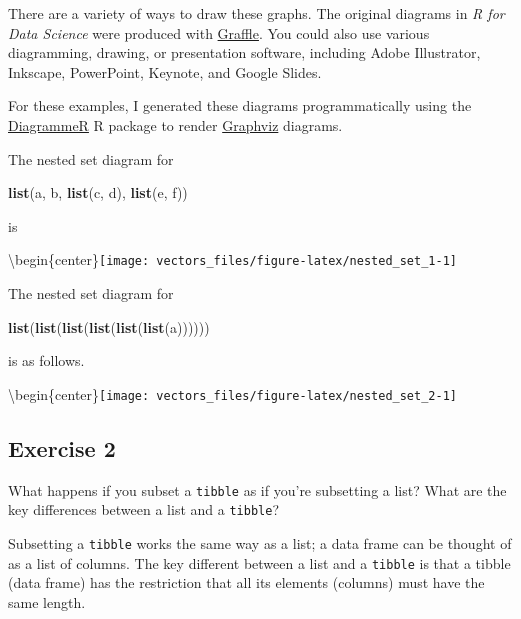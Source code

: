 \documentclass[]{book}
\newenvironment{Shaded}{\begin{snugshade}}{\end{snugshade}}
\newcommand{\KeywordTok}[1]{\textcolor[rgb]{0.13,0.29,0.53}{\textbf{#1}}}
\newcommand{\NormalTok}[1]{#1}
\theoremstyle{plain}
\theoremstyle{remark}
\theoremstyle{definition}
\theoremstyle{definition}
\theoremstyle{definition}
\theoremstyle{remark}
\begin{document}
There are a variety of ways to draw these graphs. The original diagrams
in \emph{R for Data Science} were produced with
\href{https://www.omnigroup.com/omnigraffle}{Graffle}. You could also
use various diagramming, drawing, or presentation software, including
Adobe Illustrator, Inkscape, PowerPoint, Keynote, and Google Slides.

For these examples, I generated these diagrams programmatically using
the
\href{http://rich-iannone.github.io/DiagrammeR/graphviz_and_mermaid.html}{DiagrammeR}
R package to render \href{https://www.graphviz.org/}{Graphviz} diagrams.

The nested set diagram for

\begin{Shaded}
\begin{Highlighting}[]
\KeywordTok{list}\NormalTok{(a, b, }\KeywordTok{list}\NormalTok{(c, d), }\KeywordTok{list}\NormalTok{(e, f))}
\end{Highlighting}
\end{Shaded}

is

\textbackslash{}begin\{center\}\texttt{[image: vectors\_files/figure-latex/nested\_set\_1-1]}

The nested set diagram for

\begin{Shaded}
\begin{Highlighting}[]
\KeywordTok{list}\NormalTok{(}\KeywordTok{list}\NormalTok{(}\KeywordTok{list}\NormalTok{(}\KeywordTok{list}\NormalTok{(}\KeywordTok{list}\NormalTok{(}\KeywordTok{list}\NormalTok{(a))))))}
\end{Highlighting}
\end{Shaded}

is as follows.

\textbackslash{}begin\{center\}\texttt{[image: vectors\_files/figure-latex/nested\_set\_2-1]}

\hypertarget{exercise-2-53}{%
\subsection{Exercise 2}\label{exercise-2-53}}

What happens if you subset a \texttt{tibble} as if you're subsetting a
list? What are the key differences between a list and a \texttt{tibble}?

Subsetting a \texttt{tibble} works the same way as a list; a data frame
can be thought of as a list of columns. The key different between a list
and a \texttt{tibble} is that a tibble (data frame) has the restriction
that all its elements (columns) must have the same length.
\end{document}
